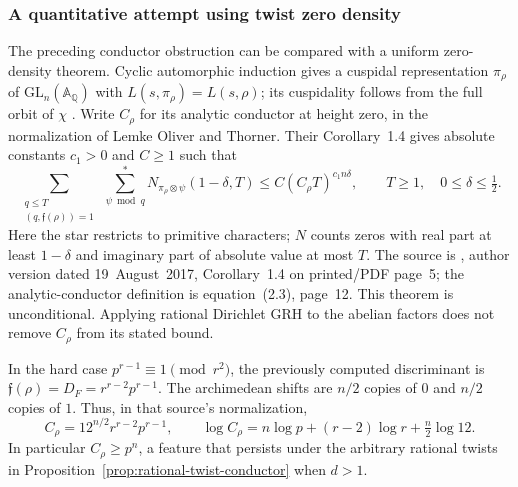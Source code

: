 \documentclass[11pt]{article}
\theoremstyle{definition}
\theoremstyle{remark}
\begin{document}
\subsubsection{A quantitative attempt using twist zero density}

The preceding conductor obstruction can be compared with a uniform zero-density theorem. Cyclic automorphic induction gives a cuspidal
representation \(\pi_\rho\) of \(\mathrm{GL}_n(\mathbb A_{\mathbb Q})\)
with \(L(s,\pi_\rho)=L(s,\rho)\); its cuspidality follows from the full
orbit of \(\chi\)
\citep[Chapter~III, \S6, Theorem~6.2 and Lemma~6.4]{ArthurClozel1989}.
Write \(C_\rho\) for its analytic conductor at height zero, in the
normalization of Lemke Oliver and Thorner.
Their Corollary~1.4 gives absolute constants \(c_1>0\) and \(C\geq1\)
such that
\begin{equation}\label{eq:LOT-twist-density}
 \sum_{\substack{q\leq T\\(q,\mathfrak f(\rho))=1}}
 \ \sum_{\psi\bmod q}^{*}
 N_{\pi_\rho\otimes\psi}(1-\delta,T)
 \leq C(C_\rho T)^{c_1n\delta},
 \qquad T\geq1,\quad 0\leq\delta\leq\tfrac12.
\end{equation}
Here the star restricts to primitive characters; \(N\) counts zeros
with real part at least \(1-\delta\) and imaginary part of absolute
value at most \(T\).
The source is \citet{LemkeOliverThorner2019}, author version dated
19~August~2017, Corollary~1.4 on printed/PDF page~5;
the analytic-conductor definition is equation~(2.3), page~12.
This theorem is unconditional. Applying rational Dirichlet GRH to
the abelian factors does not remove \(C_\rho\) from its stated bound.

In the hard case \(p^{r-1}\equiv1\pmod{r^2}\), the previously computed
discriminant is
\(\mathfrak f(\rho)=D_F=r^{r-2}p^{r-1}\).
The archimedean shifts are \(n/2\) copies of \(0\) and \(n/2\) copies
of \(1\). Thus, in that source's normalization,
\begin{equation}\label{eq:twist-analytic-conductor}
 C_\rho=12^{n/2}r^{r-2}p^{r-1},
 \qquad
 \log C_\rho
 =n\log p+(r-2)\log r+\tfrac n2\log12.
\end{equation}
In particular \(C_\rho\geq p^n\), a feature that persists under the
arbitrary rational twists in
Proposition~\ref{prop:rational-twist-conductor} when \(d>1\).
\end{document}

